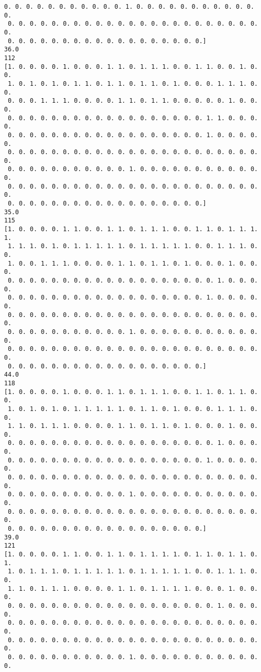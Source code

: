 \documentclass[11pt]{article}
\begin{document}
\begin{Verbatim}[commandchars=\\\{\}]
 0. 0. 0. 0. 0. 0. 0. 0. 0. 0. 0. 1. 0. 0. 0. 0. 0. 0. 0. 0. 0. 0. 0. 0.
 0. 0. 0. 0. 0. 0. 0. 0. 0. 0. 0. 0. 0. 0. 0. 0. 0. 0. 0. 0. 0. 0. 0. 0.
 0. 0. 0. 0. 0. 0. 0. 0. 0. 0. 0. 0. 0. 0. 0. 0. 0. 0.]
36.0
112
[1. 0. 0. 0. 0. 1. 0. 0. 0. 1. 1. 0. 1. 1. 1. 0. 0. 1. 1. 0. 0. 1. 0. 0.
 1. 0. 1. 0. 1. 0. 1. 1. 0. 1. 1. 0. 1. 1. 0. 1. 0. 0. 0. 1. 1. 1. 0. 0.
 0. 0. 0. 1. 1. 1. 0. 0. 0. 0. 1. 1. 0. 1. 1. 0. 0. 0. 0. 0. 1. 0. 0. 0.
 0. 0. 0. 0. 0. 0. 0. 0. 0. 0. 0. 0. 0. 0. 0. 0. 0. 0. 1. 1. 0. 0. 0. 0.
 0. 0. 0. 0. 0. 0. 0. 0. 0. 0. 0. 0. 0. 0. 0. 0. 0. 0. 1. 0. 0. 0. 0. 0.
 0. 0. 0. 0. 0. 0. 0. 0. 0. 0. 0. 0. 0. 0. 0. 0. 0. 0. 0. 0. 0. 0. 0. 0.
 0. 0. 0. 0. 0. 0. 0. 0. 0. 0. 0. 1. 0. 0. 0. 0. 0. 0. 0. 0. 0. 0. 0. 0.
 0. 0. 0. 0. 0. 0. 0. 0. 0. 0. 0. 0. 0. 0. 0. 0. 0. 0. 0. 0. 0. 0. 0. 0.
 0. 0. 0. 0. 0. 0. 0. 0. 0. 0. 0. 0. 0. 0. 0. 0. 0. 0.]
35.0
115
[1. 0. 0. 0. 0. 1. 1. 0. 0. 1. 1. 0. 1. 1. 1. 0. 0. 1. 1. 0. 1. 1. 1. 1.
 1. 1. 1. 0. 1. 0. 1. 1. 1. 1. 1. 0. 1. 1. 1. 1. 1. 0. 0. 1. 1. 1. 0. 0.
 1. 0. 0. 1. 1. 1. 0. 0. 0. 0. 1. 1. 0. 1. 1. 0. 1. 0. 0. 0. 1. 0. 0. 0.
 0. 0. 0. 0. 0. 0. 0. 0. 0. 0. 0. 0. 0. 0. 0. 0. 0. 0. 0. 1. 0. 0. 0. 0.
 0. 0. 0. 0. 0. 0. 0. 0. 0. 0. 0. 0. 0. 0. 0. 0. 0. 0. 1. 0. 0. 0. 0. 0.
 0. 0. 0. 0. 0. 0. 0. 0. 0. 0. 0. 0. 0. 0. 0. 0. 0. 0. 0. 0. 0. 0. 0. 0.
 0. 0. 0. 0. 0. 0. 0. 0. 0. 0. 0. 1. 0. 0. 0. 0. 0. 0. 0. 0. 0. 0. 0. 0.
 0. 0. 0. 0. 0. 0. 0. 0. 0. 0. 0. 0. 0. 0. 0. 0. 0. 0. 0. 0. 0. 0. 0. 0.
 0. 0. 0. 0. 0. 0. 0. 0. 0. 0. 0. 0. 0. 0. 0. 0. 0. 0.]
44.0
118
[1. 0. 0. 0. 0. 1. 0. 0. 0. 1. 1. 0. 1. 1. 1. 0. 0. 1. 1. 0. 1. 1. 0. 0.
 1. 0. 1. 0. 1. 0. 1. 1. 1. 1. 1. 0. 1. 1. 0. 1. 0. 0. 0. 1. 1. 1. 0. 0.
 1. 1. 0. 1. 1. 1. 0. 0. 0. 0. 1. 1. 0. 1. 1. 0. 1. 0. 0. 0. 1. 0. 0. 0.
 0. 0. 0. 0. 0. 0. 0. 0. 0. 0. 0. 0. 0. 0. 0. 0. 0. 0. 0. 1. 0. 0. 0. 0.
 0. 0. 0. 0. 0. 0. 0. 0. 0. 0. 0. 0. 0. 0. 0. 0. 0. 0. 1. 0. 0. 0. 0. 0.
 0. 0. 0. 0. 0. 0. 0. 0. 0. 0. 0. 0. 0. 0. 0. 0. 0. 0. 0. 0. 0. 0. 0. 0.
 0. 0. 0. 0. 0. 0. 0. 0. 0. 0. 0. 1. 0. 0. 0. 0. 0. 0. 0. 0. 0. 0. 0. 0.
 0. 0. 0. 0. 0. 0. 0. 0. 0. 0. 0. 0. 0. 0. 0. 0. 0. 0. 0. 0. 0. 0. 0. 0.
 0. 0. 0. 0. 0. 0. 0. 0. 0. 0. 0. 0. 0. 0. 0. 0. 0. 0.]
39.0
121
[1. 0. 0. 0. 0. 1. 1. 0. 0. 1. 1. 0. 1. 1. 1. 1. 0. 1. 1. 0. 1. 1. 0. 1.
 1. 0. 1. 1. 1. 0. 1. 1. 1. 1. 1. 0. 1. 1. 1. 1. 1. 0. 0. 1. 1. 1. 0. 0.
 1. 1. 0. 1. 1. 1. 0. 0. 0. 0. 1. 1. 0. 1. 1. 1. 1. 0. 0. 0. 1. 0. 0. 0.
 0. 0. 0. 0. 0. 0. 0. 0. 0. 0. 0. 0. 0. 0. 0. 0. 0. 0. 0. 1. 0. 0. 0. 0.
 0. 0. 0. 0. 0. 0. 0. 0. 0. 0. 0. 0. 0. 0. 0. 0. 0. 0. 0. 0. 0. 0. 0. 0.
 0. 0. 0. 0. 0. 0. 0. 0. 0. 0. 0. 0. 0. 0. 0. 0. 0. 0. 0. 0. 0. 0. 0. 0.
 0. 0. 0. 0. 0. 0. 0. 0. 0. 0. 0. 1. 0. 0. 0. 0. 0. 0. 0. 0. 0. 0. 0. 0.

\end{Verbatim}
\end{document}
